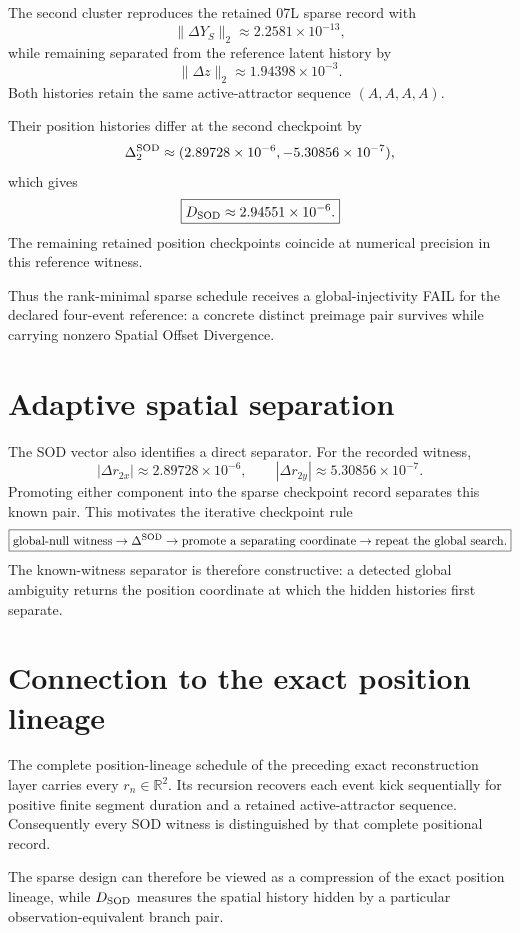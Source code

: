 The second cluster reproduces the retained 07L sparse record with
\[
\|\Delta Y_S\|_2
\approx2.2581\times10^{-13},
\]
while remaining separated from the reference latent history by
\[
\|\Delta z\|_2
\approx1.94398\times10^{-3}.
\]
Both histories retain the same active-attractor sequence $(A,A,A,A)$.

Their position histories differ at the second checkpoint by
\[
\Delta_2^{\rm SOD}
\approx
(2.89728\times10^{-6},-5.30856\times10^{-7}),
\]
which gives
\[
\boxed{
D_{\rm SOD}\approx2.94551\times10^{-6}.
}
\]
The remaining retained position checkpoints coincide at numerical precision in this reference witness.

Thus the rank-minimal sparse schedule receives a global-injectivity FAIL for the declared four-event reference: a concrete distinct preimage pair survives while carrying nonzero Spatial Offset Divergence.

\section{Adaptive spatial separation}

The SOD vector also identifies a direct separator. For the recorded witness,
\[
|\Delta r_{2x}|\approx2.89728\times10^{-6},
\qquad
|\Delta r_{2y}|\approx5.30856\times10^{-7}.
\]
Promoting either component into the sparse checkpoint record separates this known pair. This motivates the iterative checkpoint rule
\[
\boxed{
\text{global-null witness}
\rightarrow
\Delta^{\rm SOD}
\rightarrow
\text{promote a separating coordinate}
\rightarrow
\text{repeat the global search}.
}
\]
The known-witness separator is therefore constructive: a detected global ambiguity returns the position coordinate at which the hidden histories first separate.

\section{Connection to the exact position lineage}

The complete position-lineage schedule of the preceding exact reconstruction layer carries every $r_n\in\mathbb R^2$. Its recursion recovers each event kick sequentially for positive finite segment duration and a retained active-attractor sequence. Consequently every SOD witness is distinguished by that complete positional record.

The sparse design can therefore be viewed as a compression of the exact position lineage, while $D_{\rm SOD}$ measures the spatial history hidden by a particular observation-equivalent branch pair.


